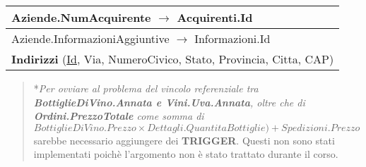 \begin{center}
\begin{minipage}[t]{7.5cm}
{\begin{tabular}{P{7.5cm}}
				\midrule
				Aziende.NumAcquirente $\to$ Acquirenti.Id                                                                                                          \\
				\midrule
				Aziende.InformazioniAggiuntive $\to$ Informazioni.Id                                                                                               \\
				\midrule
				 \textbf{Indirizzi} (\underline{Id}, Via, NumeroCivico, Stato, Provincia, Citta, CAP)                              \\
				\midrule
			\end{tabular}
		}
	\end{minipage}


	\begin{verse}
		*\emph{Per ovviare al problema del vincolo referenziale tra 	\textbf{BottiglieDiVino.Annata e Vini.Uva.Annata}, oltre che di \textbf{Ordini.PrezzoTotale} come somma di $BottiglieDiVino.Prezzo \times Dettagli.QuantitaBottiglie)+ Spedizioni.Prezzo$} sarebbe necessario aggiungere dei \textbf{TRIGGER}. Questi non sono stati implementati poichè l'argomento non è stato trattato durante il corso.
	\end{verse}

\end{center}
